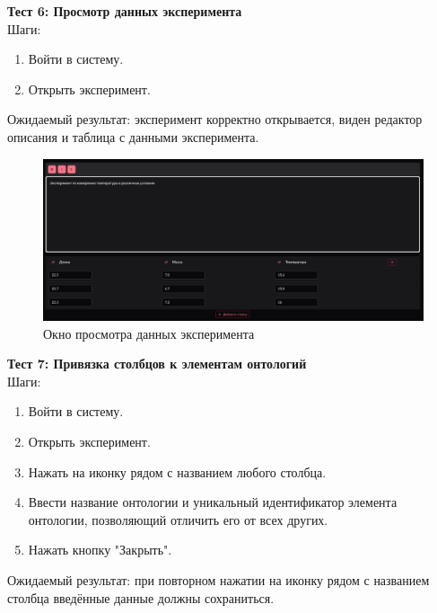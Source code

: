 \documentclass[a4paper,12pt,reqno]{article}
\begin{document}
    \textbf{Тест 6: Просмотр данных эксперимента}\\
    Шаги:
    \begin{enumerate}
        \item Войти в систему.
        \item Открыть эксперимент.
    \end{enumerate}
    Ожидаемый результат: эксперимент корректно открывается, виден редактор описания и таблица с данными эксперимента.

    \begin{figure}[H]
        \centering
        \includegraphics[width=\linewidth]{img/experiment_view.png}
        \caption{Окно просмотра данных эксперимента}
    \end{figure}
    \vspace{0.5cm}

    \textbf{Тест 7: Привязка столбцов к элементам онтологий}\\
    Шаги:
    \begin{enumerate}
        \item Войти в систему.
        \item Открыть эксперимент.
        \item Нажать на иконку рядом с названием любого столбца.
        \item Ввести название онтологии и уникальный идентификатор элемента онтологии, позволяющий отличить его от всех других.
        \item Нажать кнопку "Закрыть".
    \end{enumerate}
    Ожидаемый результат: при повторном нажатии на иконку рядом с названием столбца введённые данные должны сохраниться.
\end{document}

